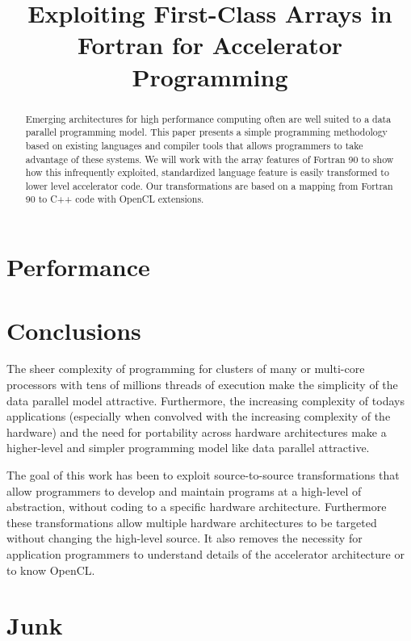 \documentclass[10pt, conference, compsocconf]{IEEEtran}
\title{Exploiting First-Class Arrays in Fortran for Accelerator Programming}
\author{\IEEEauthorblockN{Matthew J. Sottile}
\IEEEauthorblockA{Galois, Inc.\\
Email: matt@galois.com}
\and
\IEEEauthorblockN{Craig E Rasmussen}
\IEEEauthorblockA{Los Alamos National Laboratory\\
Email: rasmussn@lanl.gov}
}
\begin{document}
\maketitle

\begin{abstract}
Emerging architectures for high performance computing often are well
suited to a data parallel programming model.  This paper presents a
simple programming methodology based on existing languages and compiler
tools that allows programmers to take advantage of these systems.
We will work with the array features of Fortran 90 to show how this
infrequently exploited, standardized language feature is easily
transformed to lower level accelerator code.  Our transformations are
based on a mapping from Fortran 90 to C++ code with OpenCL extensions.
\end{abstract}








\section{Performance}

\section{Conclusions}


The sheer complexity of programming for clusters of many or multi-core
processors with tens of millions threads of execution make the simplicity of
the data parallel model attractive.  Furthermore, the increasing complexity of
todays applications (especially when convolved with the increasing complexity
of the hardware) and the need for portability across hardware architectures
make a higher-level and simpler programming model like data parallel
attractive.

The goal of this work has been to exploit source-to-source transformations that
allow programmers to develop and maintain programs at a high-level of
abstraction, without coding to a specific hardware architecture.
Furthermore these transformations allow multiple hardware architectures
to be targeted without changing the high-level source.  It also removes the
necessity for application programmers to understand details of the accelerator
architecture or to know OpenCL.



\section{Junk}

\cite{chamberlain04zpl, roth97stencils}



\end{document}
